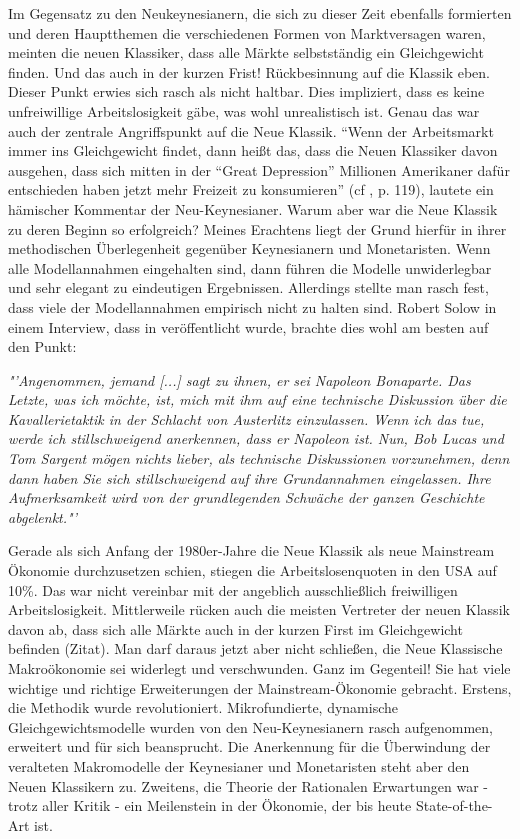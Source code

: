 Im Gegensatz zu den Neukeynesianern, die sich zu dieser Zeit ebenfalls formierten und deren Hauptthemen die verschiedenen Formen von Marktversagen waren, meinten die neuen Klassiker, dass alle Märkte selbstständig ein Gleichgewicht finden. Und das auch in der kurzen Frist! Rückbesinnung auf die Klassik eben. Dieser Punkt erwies sich rasch als nicht haltbar. Dies impliziert, dass es keine unfreiwillige Arbeitslosigkeit gäbe, was wohl unrealistisch ist. Genau das war auch der zentrale Angriffspunkt auf die Neue Klassik. "`Wenn der Arbeitsmarkt immer ins Gleichgewicht findet, dann heißt das, dass die Neuen Klassiker davon ausgehen, dass sich mitten in der "`Great Depression"' Millionen Amerikaner dafür entschieden haben jetzt mehr Freizeit zu konsumieren"' (cf \cite{Stiglitz1987}, p. 119), lautete ein hämischer Kommentar der Neu-Keynesianer. 
Warum aber war die Neue Klassik zu deren Beginn so erfolgreich? Meines Erachtens liegt der Grund hierfür in ihrer methodischen Überlegenheit gegenüber Keynesianern und Monetaristen. Wenn alle Modellannahmen eingehalten sind, dann führen die Modelle unwiderlegbar und sehr elegant zu eindeutigen Ergebnissen. Allerdings stellte man rasch fest, dass viele der Modellannahmen empirisch nicht zu halten sind. Robert Solow in einem Interview, dass in \textcite[S. 146]{Klamer1984} veröffentlicht wurde, brachte dies wohl am besten auf den Punkt:

\textit{"'Angenommen, jemand [...] sagt zu ihnen, er sei Napoleon Bonaparte. Das Letzte, was ich möchte, ist, mich mit ihm auf eine technische Diskussion über die Kavallerietaktik in der Schlacht von Austerlitz einzulassen. Wenn ich das tue, werde ich stillschweigend anerkennen, dass er Napoleon ist. Nun, Bob Lucas und Tom Sargent mögen nichts lieber, als technische Diskussionen vorzunehmen, denn dann haben Sie sich stillschweigend auf ihre Grundannahmen eingelassen. Ihre Aufmerksamkeit wird von der grundlegenden Schwäche der ganzen Geschichte abgelenkt."'}

Gerade als sich Anfang der 1980er-Jahre die Neue Klassik als neue Mainstream Ökonomie durchzusetzen schien, stiegen die Arbeitslosenquoten in den USA auf 10\%. Das war nicht vereinbar mit der angeblich ausschließlich freiwilligen Arbeitslosigkeit. Mittlerweile rücken auch die meisten Vertreter der neuen Klassik davon ab, dass sich alle Märkte auch in der kurzen First im Gleichgewicht befinden (Zitat).
Man darf daraus jetzt aber nicht schließen, die Neue Klassische Makroökonomie sei widerlegt und verschwunden. Ganz im Gegenteil! Sie hat viele wichtige und richtige Erweiterungen der Mainstream-Ökonomie gebracht. Erstens, die Methodik wurde revolutioniert. Mikrofundierte, dynamische Gleichgewichtsmodelle wurden von den Neu-Keynesianern rasch aufgenommen, erweitert und für sich beansprucht. Die Anerkennung für die Überwindung der veralteten Makromodelle der Keynesianer und Monetaristen steht aber den Neuen Klassikern zu. Zweitens, die Theorie der Rationalen Erwartungen war - trotz aller Kritik - ein Meilenstein in der Ökonomie, der bis heute State-of-the-Art ist.

